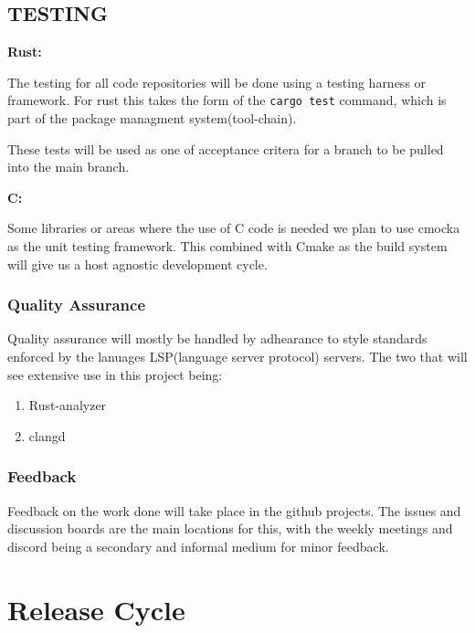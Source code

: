 \hypertarget{testing}{%
\subsection{TESTING}\label{testing}}

\textbf{Rust:}

The testing for all code repositories will be done using a testing
harness or framework. For rust this takes the form of the
\texttt{cargo\ test} command, which is part of the package managment
system(tool-chain).

These tests will be used as one of acceptance critera for a branch to be
pulled into the main branch.

\textbf{C:}

Some libraries or areas where the use of C code is needed we plan to use
cmocka as the unit testing framework. This combined with Cmake as the
build system will give us a host agnostic development cycle.

\hypertarget{quality-assurance}{%
\subsubsection{Quality Assurance}\label{quality-assurance}}

Quality assurance will mostly be handled by adhearance to style
standards enforced by the lanuages LSP(language server protocol)
servers. The two that will see extensive use in this project being:

\begin{enumerate}
\def\labelenumi{\arabic{enumi}.}
\tightlist
\item
  Rust-analyzer
\item
  clangd
\end{enumerate}

\hypertarget{feedback}{%
\subsubsection{Feedback}\label{feedback}}

Feedback on the work done will take place in the github projects. The
issues and discussion boards are the main locations for this, with the
weekly meetings and discord being a secondary and informal medium for
minor feedback.

\hypertarget{release-cycle}{%
\section{Release Cycle}\label{release-cycle}}


